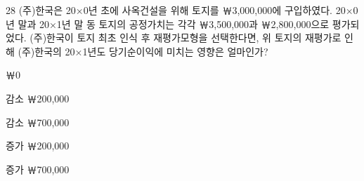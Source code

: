 \begin{question}{28}
(주)한국은 20×0년 초에 사옥건설을 위해 토지를 ￦3,000,000에 구입하였다. 20×0년 말과 20×1년 말 동 토지의 공정가치는 각각 ￦3,500,000과 ￦2,800,000으로 평가되었다. (주)한국이 토지 최초 인식 후 재평가모형을 선택한다면, 위 토지의 재평가로 인해 (주)한국의 20×1년도 당기순이익에 미치는 영향은 얼마인가?
\begin{choices}
  \item ￦0
  \item 감소 ￦200,000
  \item 감소 ￦700,000
  \item 증가 ￦200,000
  \item 증가 ￦700,000
\end{choices}
\end{question}
